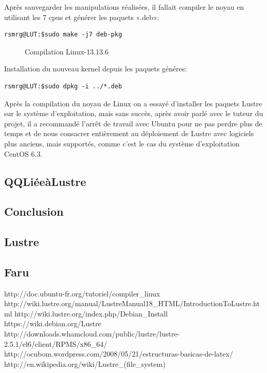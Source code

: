 \documentclass[12pt]{article}
\begin{document}
Après sauvegarder les manipulations réalisées, il fallait compiler le noyau en utilisant les 7 cpus et générer les paquets «.deb»:

\begin{verbatim}
rsmrg@LUT:$sudo make -j7 deb-pkg
\end{verbatim}

\begin{figure}[Compilation]
\caption{Compilation Linux-13.13.6}
\label{kernel}
\end{figure}

Installation du nouveau kernel depuis les paquets généres:

\begin{verbatim}
rsmrg@LUT:$sudo dpkg -i ../*.deb
\end{verbatim}

Après la compilation du noyau de Linux on a essayé d'installer les paquets Lustre sur le système d'exploitation, mais sans succès, après avoir parlé avec le tuteur du projet, il a recommandé l'arrêt de travail avec Ubuntu pour  ne pas perdre plus de temps et de nous consacrer entièrement au déploiement de Lustre avec logiciels plus anciens, mais supportés, comme c'est le cas du système d'exploitation CentOS 6.3.

\newpage
\subsection{QQLiéeàLustre}
\subsection{Conclusion}
\subsection{Lustre}
\subsection{Faru}


http://doc.ubuntu-fr.org/tutoriel/compiler\_linux 
http://wiki.lustre.org/manual/LustreManual18\_HTML/IntroductionToLustre.html
http://wiki.lustre.org/index.php/Debian\_Install
https://wiki.debian.org/Lustre
http://downloads.whamcloud.com/public/lustre/lustre-2.5.1/el6/client/RPMS/x86\_64/
http://ocubom.wordpress.com/2008/05/21/estructuras-basicas-de-latex/
http://en.wikipedia.org/wiki/Lustre\_(file\_system)
\end{document}
